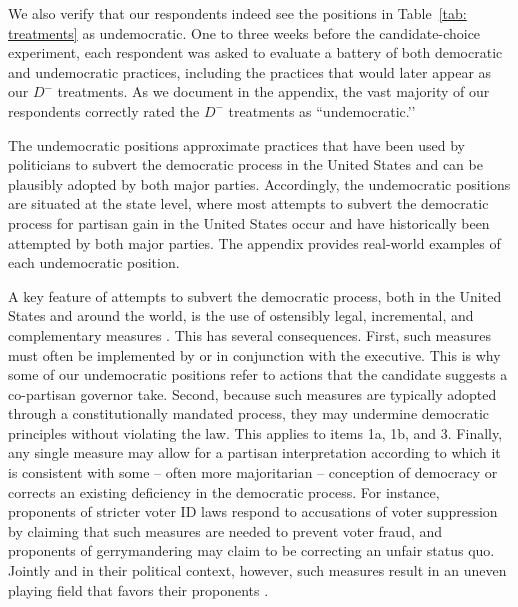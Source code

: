\documentclass[letterpaper, 12pt]{article}
\begin{document}
\begin{raggedright}
\begin{description}[style=unboxed,leftmargin=0em,itemsep=0em]
We also verify that our respondents indeed see the positions in Table~\ref{tab: treatments} as undemocratic. One to three weeks before the candidate-choice experiment, each respondent was asked to evaluate a battery of both democratic and undemocratic practices, including the practices that would later appear as our $D^-$ treatments. As we document in the appendix, the vast majority of our respondents correctly rated the $D^-$ treatments as ``undemocratic.’’

\item [Contextual realism and partisan balance:] The undemocratic positions approximate practices that have been used by politicians to subvert the democratic process in the United States and can be plausibly adopted by both major parties. Accordingly, the undemocratic positions are situated at the state level, where most attempts to subvert the democratic process for partisan gain in the United States occur and have historically been attempted by both major parties. The appendix provides real-world examples of each undemocratic position.

\item [Incremental violations:] A key feature of attempts to subvert the democratic process, both in the United States and around the world, is the use of ostensibly legal, incremental, and complementary measures \citep{Levitsky2018,WaldnerLust2018}. This has several consequences. First, such measures must often be implemented by or in conjunction with the executive. This is why some of our undemocratic positions refer to actions that the candidate suggests a co-partisan governor take. Second, because such measures are typically adopted through a constitutionally mandated process, they may undermine democratic principles without violating the law. This applies to items 1a, 1b, and 3. Finally, any single measure may allow for a partisan interpretation according to which it is consistent with some -- often more majoritarian -- conception of democracy or corrects an existing deficiency in the democratic process. For instance, proponents of stricter voter ID laws respond to accusations of voter suppression by claiming that such measures are needed to prevent voter fraud, and proponents of gerrymandering may claim to be correcting an unfair status quo. Jointly and in their political context, however, such measures result in an uneven playing field that favors their proponents \citep{Levitsky2010,Schedler2002}.


\end{description}
\end{raggedright}
\end{document}
